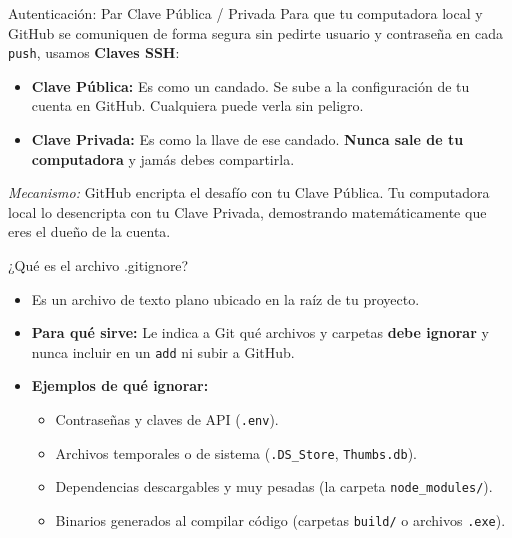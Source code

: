 \documentclass[11pt, aspectratio=169]{beamer}
\begin{document}
\begin{frame}{Autenticación: Par Clave Pública / Privada}
    Para que tu computadora local y GitHub se comuniquen de forma segura sin pedirte usuario y contraseña en cada \texttt{push}, usamos \textbf{Claves SSH}:
    \vspace{0.5cm}
    \begin{itemize}
        \item \textbf{Clave Pública:} Es como un candado. Se sube a la configuración de tu cuenta en GitHub. Cualquiera puede verla sin peligro.
        \item \textbf{Clave Privada:} Es como la llave de ese candado. \textbf{Nunca sale de tu computadora} y jamás debes compartirla.
    \end{itemize}
    \vspace{0.5cm}
    \textit{Mecanismo:} GitHub encripta el desafío con tu Clave Pública. Tu computadora local lo desencripta con tu Clave Privada, demostrando matemáticamente que eres el dueño de la cuenta.
\end{frame}

\begin{frame}{¿Qué es el archivo .gitignore?}
    \begin{itemize}
        \item Es un archivo de texto plano ubicado en la raíz de tu proyecto.
        \item \textbf{Para qué sirve:} Le indica a Git qué archivos y carpetas \textbf{debe ignorar} y nunca incluir en un \texttt{add} ni subir a GitHub.
        \item \textbf{Ejemplos de qué ignorar:}
        \begin{itemize}
            \item Contraseñas y claves de API (\texttt{.env}).
            \item Archivos temporales o de sistema (\texttt{.DS\_Store}, \texttt{Thumbs.db}).
            \item Dependencias descargables y muy pesadas (la carpeta \texttt{node\_modules/}).
            \item Binarios generados al compilar código (carpetas \texttt{build/} o archivos \texttt{.exe}).
        \end{itemize}
    \end{itemize}
\end{frame}
\end{document}
